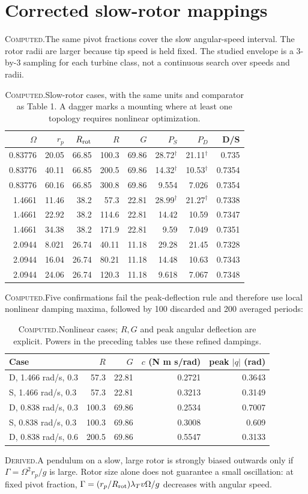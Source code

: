 \documentclass[10pt,a4paper]{article}
\newcommand{\D}{\textcolor{accent}{\textsc{Derived.}}\enspace}
\newcommand{\C}{\textcolor{accent}{\textsc{Computed.}}\enspace}
\newcommand{\page}[1]{\clearpage\section{#1}}
\begin{document}
\page{Corrected slow-rotor mappings}
\C The same pivot fractions cover the slow angular-speed interval. The rotor radii are larger because tip speed is held fixed. The studied envelope is a 3-by-3 sampling for each turbine class, not a continuous search over speeds and radii.
\begin{table}[H]\centering\small
\caption{\C Slow-rotor cases, with the same units and comparator as Table 1. A dagger marks a mounting where at least one topology requires nonlinear optimization.}
\begin{tabular*}{\textwidth}{@{\extracolsep{\fill}}rrrrrrrr@{}}\toprule
$\Omega$&$r_p$&$R_{\rm rot}$&$R$&$G$&$P_S$&$P_D$&D/S\\\midrule
0.83776 & 20.05 & 66.85 & 100.3 & 69.86 & 28.72$^{\dagger}$ & 21.11$^{\dagger}$ & 0.735 \\
0.83776 & 40.11 & 66.85 & 200.5 & 69.86 & 14.32$^{\dagger}$ & 10.53$^{\dagger}$ & 0.7354 \\
0.83776 & 60.16 & 66.85 & 300.8 & 69.86 & 9.554 & 7.026 & 0.7354 \\
1.4661 & 11.46 & 38.2 & 57.3 & 22.81 & 28.99$^{\dagger}$ & 21.27$^{\dagger}$ & 0.7338 \\
1.4661 & 22.92 & 38.2 & 114.6 & 22.81 & 14.42 & 10.59 & 0.7347 \\
1.4661 & 34.38 & 38.2 & 171.9 & 22.81 & 9.59 & 7.049 & 0.7351 \\
2.0944 & 8.021 & 26.74 & 40.11 & 11.18 & 29.28 & 21.45 & 0.7328 \\
2.0944 & 16.04 & 26.74 & 80.21 & 11.18 & 14.48 & 10.63 & 0.7343 \\
2.0944 & 24.06 & 26.74 & 120.3 & 11.18 & 9.618 & 7.067 & 0.7348 \\
\bottomrule\end{tabular*}\end{table}
\C Five confirmations fail the peak-deflection rule and therefore use local nonlinear damping maxima, followed by 100 discarded and 200 averaged periods:
\begin{table}[H]\centering\small
\caption{\C Nonlinear cases; $R,G$ and peak angular deflection are explicit. Powers in the preceding tables use these refined dampings.}
\begin{tabular}{lrrrr}\toprule
Case&$R$&$G$&$c$ (N m s/rad)&peak $|q|$ (rad)\\\midrule
D, 1.466 rad/s, 0.3 & 57.3 & 22.81 & 0.2721 & 0.3643 \\
S, 1.466 rad/s, 0.3 & 57.3 & 22.81 & 0.3213 & 0.3149 \\
D, 0.838 rad/s, 0.3 & 100.3 & 69.86 & 0.2534 & 0.7007 \\
S, 0.838 rad/s, 0.3 & 100.3 & 69.86 & 0.3008 & 0.609 \\
D, 0.838 rad/s, 0.6 & 200.5 & 69.86 & 0.5547 & 0.3133 \\
\bottomrule\end{tabular}\end{table}
\D A pendulum on a slow, large rotor is strongly biased outwards only if $\Gamma=\Omega^2r_p/g$ is large. Rotor size alone does not guarantee a small oscillation: at fixed pivot fraction, $\Gamma=(r_p/R_{\rm rot})\lambda_Tv\Omega/g$ decreases with angular speed.
\end{document}
